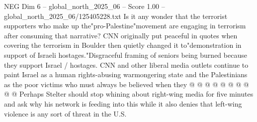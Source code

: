 \begin{textsample}{NEG Dim 6 – global\_north\_2025\_06 – Score 1.00 – global\_north\_2025\_06/125405228.txt}
Is it any wonder that the terrorist supporters who make up the"pro-Palestine"movement are engaging in terrorism after consuming that narrative?
CNN originally put peaceful in quotes when covering the terrorism in Boulder then quietly changed it to"demonstration in support of Israeli hostages."Disgraceful framing of seniors being burned because they support Israel / hostages.
CNN and other liberal media outlets continue to paint Israel as a human rights-abusing warmongering state and the Palestinians as the poor victims who must always be believed when they @ @ @ @ @ @ @ @ @ @ Perhaps Stelter should stop whining about right-wing media for five minutes and ask why his network is feeding into this while it also denies that left-wing violence is any sort of threat in the U.S.

\end{textsample}

